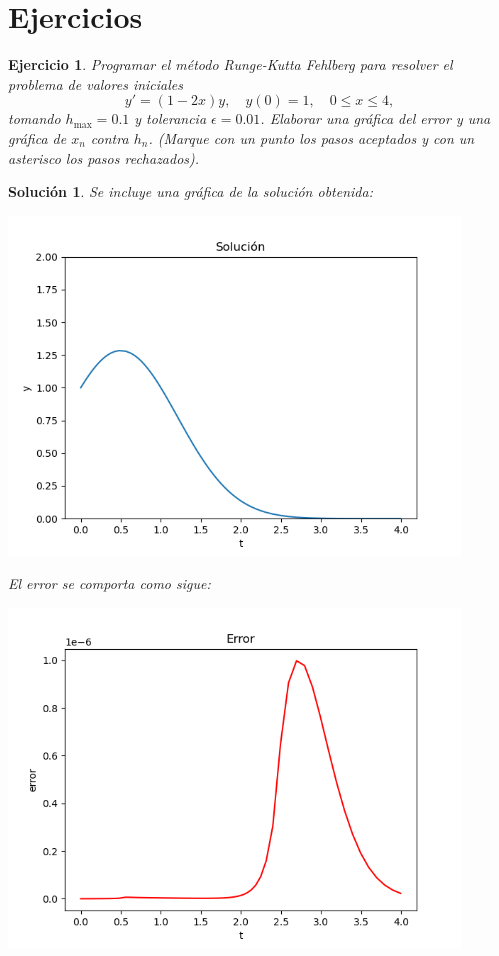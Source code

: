 \documentclass[11pt]{article}
\newtheorem{exercise}{Ejercicio}
\newtheorem*{sol}{Solución}
\begin{document}
\section{Ejercicios}

\begin{exercise}
   Programar el método Runge-Kutta Fehlberg para resolver el problema
   de valores iniciales
   \begin{equation}
     y'
     =
     (1-2x)y,
     \quad y(0)=1,
     \quad 0\leq x\leq 4
   ,\end{equation}
   tomando $h_\mathrm{max}=0.1$ y tolerancia $\epsilon = 0.01$.
   Elaborar una gráfica del error y una gráfica de $x_n$ contra $h_n$.
   (Marque con un punto los pasos aceptados y con un asterisco los
   pasos rechazados).
\end{exercise}
\begin{sol}
  Se incluye una gráfica de la solución obtenida:
  \begin{center}
  \includegraphics[width=0.9\textwidth]{img/jaac_tarea3_ejercicio1a}
  \end{center}
  \newpage
  El error se comporta como sigue:
  \begin{center}
  \includegraphics[width=0.9\textwidth]{img/jaac_tarea3_ejercicio1b}

\end{center}
\end{sol}
\end{document}
